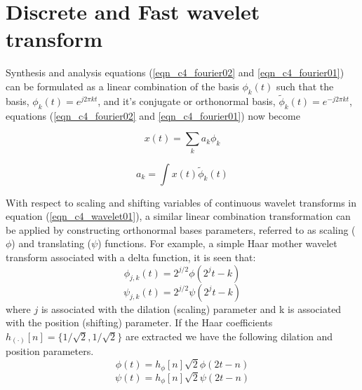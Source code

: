 \section{Discrete and Fast wavelet transform}
Synthesis and analysis equations (\ref{eqn_c4_fourier02} and \ref{eqn_c4_fourier01}) can be formulated as a linear combination of the basis $\phi_k(t)$ such that the basis, $\phi_k(t)=e^{j2\pi kt}$, and it's conjugate or orthonormal basis, $\tilde{\phi}_k(t)=e^{-j2\pi kt}$, equations (\ref{eqn_c4_fourier02} and \ref{eqn_c4_fourier01}) now become

\begin{equation}
x(t)=\sum_{k}a_k\phi_k
\label{eqn_c4_dwt02}
\end{equation}

\begin{equation}
a_k=\int x(t)\tilde{\phi}_k(t)
\label{eqn_c4_dwt01}
\end{equation}

With respect to scaling and shifting variables of continuous wavelet transforms in equation (\ref{eqn_c4_wavelet01}), a similar linear combination transformation can be applied by constructing orthonormal bases parameters, referred to as scaling ($\phi$) and translating ($\psi$) functions. For example, a simple Haar mother wavelet transform associated with a delta function, it is seen that:
\begin{equation}
\phi_{j,k}(t)=2^{j/2}\phi(2^jt-k)
\label{eqn_c4_dwt03}
\end{equation}
\begin{equation}
\psi_{j,k}(t)=2^{j/2}\psi(2^jt-k)
\label{eqn_c4_dwt04}
\end{equation}
where $j$ is associated with the dilation (scaling) parameter and k is associated with the position (shifting) parameter. If the Haar coefficients $h_{(\cdot)}[n]=\{1/\sqrt{2},1/\sqrt{2}\}$ are extracted we have the following dilation and position parameters.
\begin{equation}
\phi(t)=h_\phi[n]\sqrt{2}\phi(2t-n)
\label{eqn_c4_dwt05}
\end{equation}
\begin{equation}
\psi(t)=h_\phi[n]\sqrt{2}\psi(2t-n)
\label{eqn_c4_dwt06}
\end{equation}

